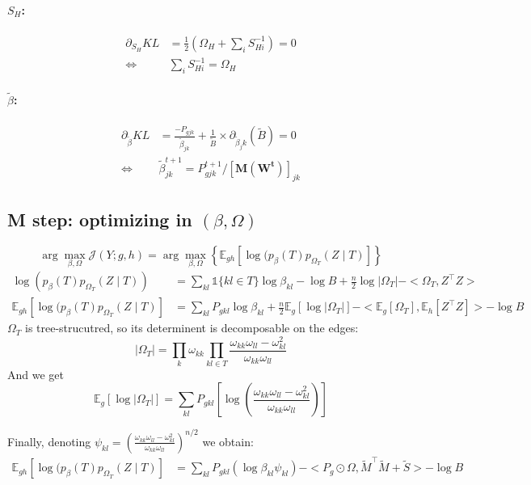 \documentclass[11pt,a4paper]{article}
\newcommand{\argmax}{\arg\!\max}
\newcommand{\Esp}{\mathds{E}}
\begin{document}
\paragraph{$S_H$:}
\begin{align*}
\partial_{S_H} KL &=  \frac{1}{2} \left(\Omega_H+ \sum_i S_{Hi}^{-1}\right) = 0\\
\iff &\sum_i S_{Hi}^{-1} = \Omega_H
\end{align*}
\paragraph{$\widetilde{\beta}$:}
\begin{align*}
\partial_{\widetilde{\beta}} KL &= \frac{-P_{gjk}}{\widetilde{\beta}_{jk}} + \frac{1}{\widetilde{B}} \times \partial_{\widetilde{\beta}_jk} (\widetilde{B})   =0\\
\iff & \widetilde{\beta}_{jk}^{t+1} = P_{gjk}^{t+1}/[\bm{M}(\bm{W^t})]_{jk}
\end{align*}
 
\subsection{M step: optimizing in $(\beta, \Omega)$}
 
$$ \argmax_{\beta, \Omega} \mathcal{J}(Y ; g,h) =\argmax_{\beta, \Omega} \left\{ \Esp_{gh} [\log (p_\beta(T)p_{\Omega_T}(Z\mid T) ]\right\} $$
\begin{align*}
\log (p_\beta(T)p_{\Omega_T}(Z\mid T))  &= \sum_{kl} \mathds{1}\{kl \in T\} \log \beta_{kl} - \log B + \frac{n}{2}\log |\Omega_T| - <\Omega_T,Z^\intercal Z>\\
\Esp_{gh} [\log (p_\beta(T)p_{\Omega_T}(Z\mid T) ] &= \sum_{kl} P_{gkl} \log\beta_{kl} +\frac{n}{2} \Esp_g[\log |\Omega_T|] - <\Esp_g [\Omega_T], \Esp_h[Z^\intercal Z]>- \log B
\end{align*}
$\Omega_T$ is tree-strucutred, so its determinent is decomposable on the edges:
$$|\Omega_{T}| = \prod_{k} \omega_{kk} \prod_{kl \in T} \frac{\omega_{kk}\omega_{ll}-\omega_{kl}^2}{\omega_{kk}\omega_{ll}}$$
And we get
$$\Esp_g[\log |\Omega_{T}|]= \sum _{kl} P_{gkl} \left[ \log\left(\frac{\omega_{kk}\omega_{ll}-\omega_{kl}^2}{\omega_{kk}\omega_{ll}}\right)\right]$$

Finally, denoting $\psi_{kl} = \left(\frac{\omega_{kk}\omega_{ll}-\omega_{kl}^2}{\omega_{kk}\omega_{ll}}\right)^{n/2}$ we obtain:
\begin{align*}
\Esp_{gh} [\log (p_\beta(T)p_{\Omega_T}(Z\mid T) ] &=\sum_{kl} P_{gkl} \left(\log  \beta_{kl}\psi_{kl}\right) - <P_g \odot \Omega, \widetilde{M}^\intercal \widetilde{M} + \widetilde{S}>- \log B
\end{align*}
\end{document}
